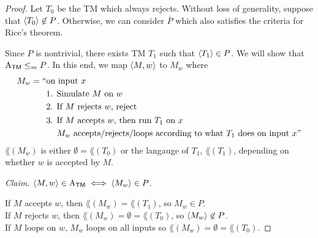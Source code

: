 \begin{proof}
    Let $T_0$ be the TM which always rejects. Without loss of generality, suppose that $\langle T_0 \rangle \not\in P$. Otherwise, we can consider $\overline{P}$ which also satisfies the criteria for Rice's theorem.
    
    Since $P$ is nontrivial, there exists TM $T_1$ such that $\langle T_1 \rangle \in P$. We will show that $\mathrm{A}_{\mathsf{TM}} \leq_m P$. In this end, we map $\langle M,w \rangle$ to $M_w$ where
    $$
    \begin{aligned}
        M_w = ``
        &\text{on input $x$} \\
        &\text{1. Simulate $M$ on $w$} \\
        &\text{2. If $M$ rejects $w$, reject} \\
        &\begin{aligned}
            \text{3. } &\text{If $M$ accepts $w$, then run $T_1$ on $x$} \\
            &\text{$M_w$ accepts/rejects/loops according to what $T_1$ does on input $x$}"
        \end{aligned}
    \end{aligned}
    $$
    $\lang(M_w)$ is either $\emptyset = \lang(T_0)$ or the langauge of $T_1$, $\lang(T_1)$, depending on whether $w$ is accepted by $M$.

    \textit{Claim}. $\langle M,w \rangle \in \mathrm{A}_{\mathsf{TM}} \iff \langle M_w \rangle \in P$.

    If $M$ accepts $w$, then $\lang(M_w) = \lang(T_1)$, so $M_w \in P$. \\
    If $M$ rejects $w$, then $\lang(M_w) = \emptyset = \lang(T_0)$, so $\langle M_w \rangle \not\in P$. \\
    If $M$ loops on $w$, $M_w$ loops on all inputs so $\lang(M_w) = \emptyset = \lang(T_0)$.
\end{proof}